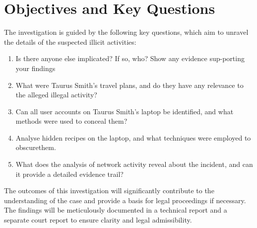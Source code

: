 \section{Objectives and Key Questions}
The investigation is guided by the following key questions, which aim to unravel the details of the suspected illicit activities:
\begin{enumerate}
    \item Is there anyone else implicated? If so, who? Show any evidence sup-porting your findings
    \item What were Taurus Smith’s travel plans, and do they have any relevance to the alleged illegal activity?
    \item Can all user accounts on Taurus Smith’s laptop be identified, and what methods were used to conceal them?
    \item Analyse hidden recipes on the laptop, and what techniques were employed to obscurethem.
    \item What does the analysis of network activity reveal about the incident, and can it provide a detailed evidence trail?
\end{enumerate}

The outcomes of this investigation will significantly contribute to the understanding of the case and provide a basis for legal proceedings if necessary. The findings will be meticulously documented in a technical report and a separate court report to ensure clarity and legal admissibility.
